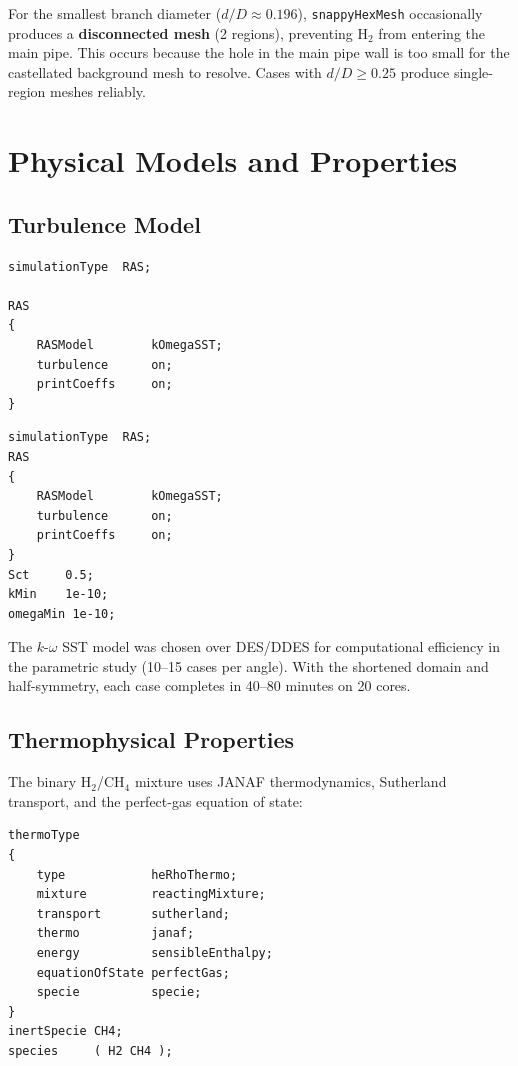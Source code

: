 \documentclass[12pt,a4paper]{report}
\begin{document}
For the smallest branch diameter ($d/D \approx 0.196$),
\texttt{snappyHexMesh} occasionally produces a \textbf{disconnected
mesh} (2 regions), preventing H$_2$ from entering the main pipe.
This occurs because the hole in the main pipe wall is too small
for the castellated background mesh to resolve.  Cases with $d/D
\geq 0.25$ produce single-region meshes reliably.


\chapter{Physical Models and Properties}
\label{ch:models}

\section{Turbulence Model}

\begin{lstlisting}[language={},title=constant/momentumTransport]
simulationType  RAS;

RAS
{
    RASModel        kOmegaSST;
    turbulence      on;
    printCoeffs     on;
}
\end{lstlisting}

\begin{lstlisting}[language={},title=constant/turbulenceProperties]
simulationType  RAS;
RAS
{
    RASModel        kOmegaSST;
    turbulence      on;
    printCoeffs     on;
}
Sct     0.5;
kMin    1e-10;
omegaMin 1e-10;
\end{lstlisting}

\noindent The $k$-$\omega$ SST model was chosen over DES/DDES for
computational efficiency in the parametric study (10--15 cases per
angle).  With the shortened domain and half-symmetry, each case
completes in 40--80 minutes on 20 cores.

\section{Thermophysical Properties}

The binary H$_2$/CH$_4$ mixture uses JANAF thermodynamics,
Sutherland transport, and the perfect-gas equation of state:

\begin{lstlisting}[language={},title=constant/thermophysicalProperties (header)]
thermoType
{
    type            heRhoThermo;
    mixture         reactingMixture;
    transport       sutherland;
    thermo          janaf;
    energy          sensibleEnthalpy;
    equationOfState perfectGas;
    specie          specie;
}
inertSpecie CH4;
species     ( H2 CH4 );
\end{lstlisting}
\end{document}
